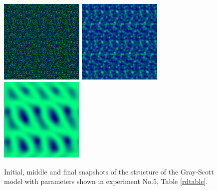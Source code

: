 \begin{figure}
\begin{center}
\includegraphics[width=4cm, height=4cm]{gs11.png}
\includegraphics[width=4cm, height=4cm]{gs12.png}
\includegraphics[width=4cm, height=4cm]{gs13.png}
\end{center}
\caption{Initial, middle and final snapshots of the structure of the Gray-Scott model with parameters shown in experiment No.5, Table \ref{rdtable}.}
\label{gs1}
\end{figure}

